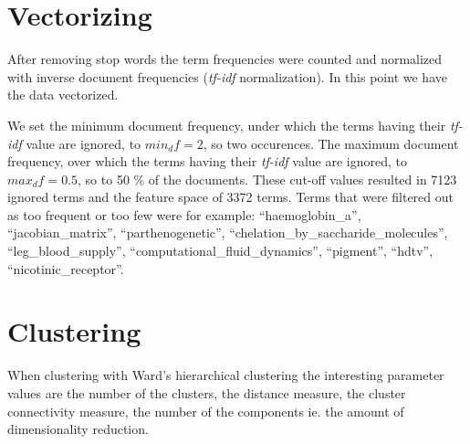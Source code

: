 \section{Vectorizing}
After removing stop words the term frequencies were counted and 
normalized with inverse document frequencies (\emph{tf-idf} 
normalization). In this point we have the data vectorized.

We set the minimum document frequency, under which the terms 
having their \emph{tf-idf} value are ignored, to $min_df=2$, so 
two occurences. The maximum document frequency, over which the 
terms having their \emph{tf-idf} value are ignored, to 
$max_df=0.5$, so to 50 \% of the documents.
These cut-off values resulted in 7123 ignored terms and the 
feature space of 3372 terms. Terms that were filtered out as too 
frequent or too few were for example: ``haemoglobin\_a'', 
``jacobian\_matrix'', 
``parthenogenetic'', ``chelation\_by\_saccharide\_molecules'', 
``leg\_blood\_supply'', ``computational\_fluid\_dynamics'', 
``pigment'', ``hdtv'', ``nicotinic\_receptor''.




\section{Clustering}
When clustering with Ward's hierarchical clustering the 
interesting parameter values are the number of the clusters, 
the distance measure, the cluster connectivity measure, the 
number of the components ie. the amount of dimensionality 
reduction.



